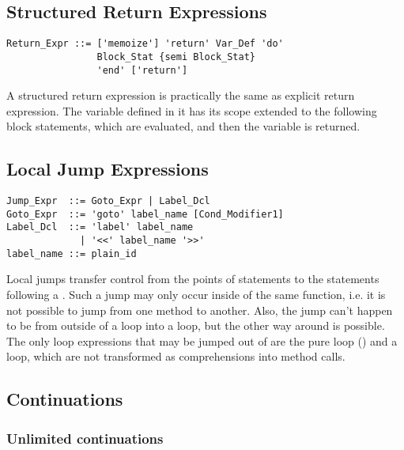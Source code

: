 \subsection{Structured Return Expressions}

\syntax\begin{lstlisting}
Return_Expr ::= ['memoize'] 'return' Var_Def 'do' 
                Block_Stat {semi Block_Stat} 
                'end' ['return']
\end{lstlisting}

A structured return expression is practically the same as explicit return expression. The variable defined in it has its scope extended to the following block statements, which are evaluated, and then the variable is returned. 






\subsection{Local Jump Expressions}
\label{sec:local-jump-expressions}

\syntax\begin{lstlisting}
Jump_Expr  ::= Goto_Expr | Label_Dcl
Goto_Expr  ::= 'goto' label_name [Cond_Modifier1]
Label_Dcl  ::= 'label' label_name 
             | '<<' label_name '>>'
label_name ::= plain_id
\end{lstlisting}

Local jumps transfer control from the points of  statements to the statements following a . Such a jump may only occur inside of the same function, i.e. it is not possible to jump from one method to another. Also, the jump can't happen to be from outside of a loop into a loop, but the other way around is possible. The only loop expressions that may be jumped out of are the pure loop () and a  loop, which are not transformed as comprehensions into method calls. 






\subsection{Continuations}
\label{sec:continuations}






\subsubsection{Unlimited continuations}

